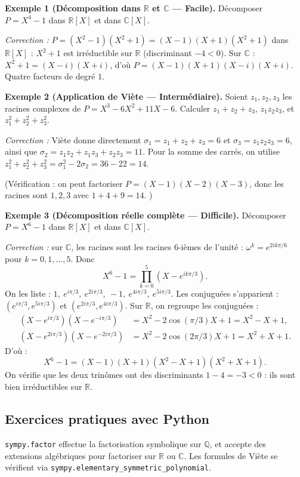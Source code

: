 \textbf{Exemple 1 (Décomposition dans $\mathbb{R}$ et $\mathbb{C}$ --- Facile).}
Décomposer $P = X^4 - 1$ dans $\mathbb{R}[X]$ et dans $\mathbb{C}[X]$.

\textit{Correction :}
$P = (X^2 - 1)(X^2 + 1) = (X - 1)(X + 1)(X^2 + 1)$ dans $\mathbb{R}[X]$ : $X^2 + 1$ est irréductible sur $\mathbb{R}$ (discriminant $-4 < 0$).
Sur $\mathbb{C}$ : $X^2 + 1 = (X - i)(X + i)$, d'où $P = (X - 1)(X + 1)(X - i)(X + i)$. Quatre facteurs de degré $1$.

\medskip

\textbf{Exemple 2 (Application de Viète --- Intermédiaire).}
Soient $z_1, z_2, z_3$ les racines complexes de $P = X^3 - 6X^2 + 11X - 6$. Calculer $z_1 + z_2 + z_3$, $z_1 z_2 z_3$, et $z_1^2 + z_2^2 + z_3^2$.

\textit{Correction :} Viète donne directement $\sigma_1 = z_1 + z_2 + z_3 = 6$ et $\sigma_3 = z_1 z_2 z_3 = 6$, ainsi que $\sigma_2 = z_1 z_2 + z_1 z_3 + z_2 z_3 = 11$.
Pour la somme des carrés, on utilise $z_1^2 + z_2^2 + z_3^2 = \sigma_1^2 - 2 \sigma_2 = 36 - 22 = 14$.

(Vérification : on peut factoriser $P = (X-1)(X-2)(X-3)$, donc les racines sont $1, 2, 3$ avec $1 + 4 + 9 = 14$. \checkmark)

\medskip

\textbf{Exemple 3 (Décomposition réelle complète --- Difficile).}
Décomposer $P = X^6 - 1$ dans $\mathbb{R}[X]$ et dans $\mathbb{C}[X]$.

\textit{Correction :} sur $\mathbb{C}$, les racines sont les racines $6$-ièmes de l'unité : $\omega^k = e^{2 i k \pi / 6}$ pour $k = 0, 1, \dots, 5$. Donc
\[ X^6 - 1 = \prod_{k=0}^{5} (X - e^{i k \pi / 3}). \]
On les liste : $1,\ e^{i\pi/3},\ e^{2i\pi/3},\ -1,\ e^{4i\pi/3},\ e^{5i\pi/3}$. Les conjuguées s'apparient : $(e^{i\pi/3}, e^{5i\pi/3})$ et $(e^{2i\pi/3}, e^{4i\pi/3})$.
Sur $\mathbb{R}$, on regroupe les conjuguées :
\begin{align*}
(X - e^{i\pi/3})(X - e^{-i\pi/3}) &= X^2 - 2\cos(\pi/3) X + 1 = X^2 - X + 1, \\
(X - e^{2i\pi/3})(X - e^{-2i\pi/3}) &= X^2 - 2\cos(2\pi/3) X + 1 = X^2 + X + 1.
\end{align*}
D'où :
\[ X^6 - 1 = (X - 1)(X + 1)(X^2 - X + 1)(X^2 + X + 1). \]
On vérifie que les deux trinômes ont des discriminants $1 - 4 = -3 < 0$ : ils sont bien irréductibles sur $\mathbb{R}$.

\subsection{Exercices pratiques avec Python}
\texttt{sympy.factor} effectue la factorisation symbolique sur $\mathbb{Q}$, et accepte des extensions algébriques pour factoriser sur $\mathbb{R}$ ou $\mathbb{C}$. Les formules de Viète se vérifient via \texttt{sympy.elementary\_symmetric\_polynomial}.

